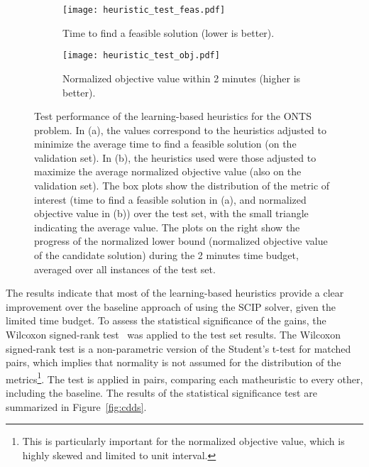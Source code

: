 \begin{figure}[h]
    \centering
    \begin{subfigure}{0.99\textwidth}
        \centering
        \texttt{[image: heuristic\_test\_feas.pdf]}
        \caption{Time to find a feasible solution (lower is better).}
        \label{fig:heuristics-test-results-feas}
    \end{subfigure}
    \begin{subfigure}{0.99\textwidth}
        \centering
        \texttt{[image: heuristic\_test\_obj.pdf]}
        \caption{Normalized objective value within 2 minutes (higher is better).}
        \label{fig:heuristics-test-results-obj}
    \end{subfigure}
    \caption{%
    Test performance of the learning-based heuristics for the ONTS problem.
    In (a), the values correspond to the heuristics adjusted to minimize the average time to find a feasible solution (on the validation set).
    In (b), the heuristics used were those adjusted to maximize the average normalized objective value (also on the validation set).
    The box plots show the distribution of the metric of interest (time to find a feasible solution in (a), and normalized objective value in (b)) over the test set, with the small triangle indicating the average value.
    The plots on the right show the progress of the normalized lower bound (normalized objective value of the candidate solution) during the 2 minutes time budget, averaged over all instances of the test set.
}
    \label{fig:heuristics-test-results}
\end{figure}

The results indicate that most of the learning-based heuristics provide a clear improvement over the baseline approach of using the SCIP solver, given the limited time budget.
To assess the statistical significance of the gains, the Wilcoxon signed-rank test~\cite{wilcoxon_1945} was applied to the test set results.
The Wilcoxon signed-rank test is a non-parametric version of the Student's t-test for matched pairs, which implies that normality is not assumed for the distribution of the metrics\footnote{This is particularly important for the normalized objective value, which is highly skewed and limited to unit interval.}.
The test is applied in pairs, comparing each matheuristic to every other, including the baseline.
The results of the statistical significance test are summarized in Figure~\ref{fig:cdds}.

